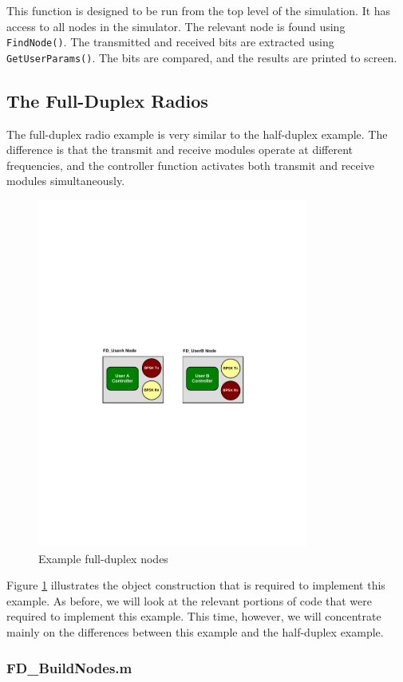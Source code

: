 This function is designed to be run from the top level of the
simulation.  It has access to all nodes in the simulator.  The
relevant node is found using \verb+FindNode()+.  The transmitted and
received bits are extracted using \verb+GetUserParams()+.  The bits
are compared, and the results are printed to screen.

\subsection{The Full-Duplex Radios}

The full-duplex radio example is very similar to the half-duplex
example.  The difference is that the transmit and receive modules
operate at different frequencies, and the controller function
activates both transmit and receive modules simultaneously.

\begin{figure}[h]
\centering
\includegraphics[width=3.5in]{figs/FD_Example}
\caption{Example full-duplex nodes} \label{fig:fdNodes}
\end{figure}

Figure \ref{fig:fdNodes} illustrates the object construction that is
required to implement this example.  As before, we will look at the
relevant portions of code that were required to implement this
example.  This time, however, we will concentrate mainly on the
differences between this example and the half-duplex example.

\subsubsection{FD\_BuildNodes.m}

